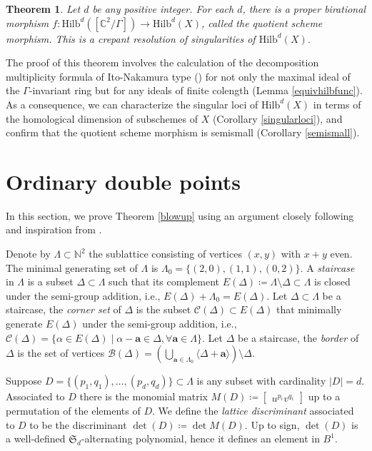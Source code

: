 \documentclass{amsart}[12pt]
\newtheorem{theorem}{Theorem}[section]
\theoremstyle{definition}
\theoremstyle{remark}
\numberwithin{equation}{section}
\newcommand{\abs}[1]{\lvert#1\rvert}
\begin{document}
\begin{theorem}\label{crepant}
Let $d$ be any positive integer. For each $d$, there is a proper birational morphism $f: \mathrm{Hilb}^{d}([\mathbb{C}^2/\Gamma]) \to \mathrm{Hilb}^{d}(X)$, called the \textit{quotient scheme morphism}. This is a crepant resolution of singularities of $\mathrm{Hilb}^{d}(X)$.
\end{theorem}
The proof of this theorem involves the calculation of the decomposition multiplicity formula of Ito-Nakamura type (\cite[Theorem 10.5.1]{IN99}) for not only the maximal ideal of the $\Gamma$-invariant ring but for any ideals of finite colength (Lemma \ref{equivhilbfunc}). As a consequence, we can  characterize the singular loci of $\mathrm{Hilb}^{d}(X)$ in terms of the homological dimension of subschemes of $X$ (Corollary \ref{singularloci}), and confirm that the quotient scheme morphism is semismall (Corollary \ref{semismall}). 


\section{Ordinary double points}

In this section, we prove Theorem \ref{blowup} using an argument closely following \cite[Section 2]{H98} and inspiration from \cite{ES14}. 

Denote by $\Lambda \subset \mathbb{N}^2$ the sublattice consisting of vertices $(x, y)$ with $x + y$ even. The minimal generating set of $\Lambda$ is $\Lambda_0 = \{(2, 0), (1, 1), (0, 2)\}$. A \textit{staircase} in $\Lambda$ is a subset $\Delta \subset \Lambda$ such that its complement $E(\Delta) \coloneqq \Lambda \setminus \Delta \subset \Lambda$ is closed under the semi-group addition, i.e., $E(\Delta) + \Lambda_0 = E(\Delta)$. Let $\Delta \subset \Lambda$ be a staircase, the \textit{corner set} of $\Delta$ is the subset $\mathcal{C}(\Delta) \subset E(\Delta)$ that minimally generate $E(\Delta)$ under the semi-group addition, i.e., $\mathcal{C}(\Delta) = \{\alpha \in E(\Delta) \mid \alpha - \mathbf{a} \in \Delta,  \forall \mathbf{a} \in \Lambda \}$. Let $\Delta$ be a staircase, the \textit{border} of $\Delta$ is the set of vertices $\mathcal{B}(\Delta) = (\bigcup_{\mathbf{a} \in \Lambda_0} \langle \Delta + \mathbf{a} \rangle) \setminus \Delta$.

Suppose $D = \{(p_1, q_1), \dots, (p_d, q_d)\} \subset \Lambda$ is any subset with cardinality $\abs{D} = d$. Associated to $D$ there is the monomial matrix $M(D) \coloneqq \begin{bmatrix} u^{p_i}v^{q_i}\end{bmatrix}$ up to a permutation of the elements of $D$. We define the \textit{lattice discriminant} associated to $D$ to be the discriminant $\det(D) \coloneqq \det M(D)$. Up to sign, $\det(D)$ is a well-defined $\mathfrak{S}_d$-alternating polynomial, hence it defines an element in $B^1$. 
\end{document}

